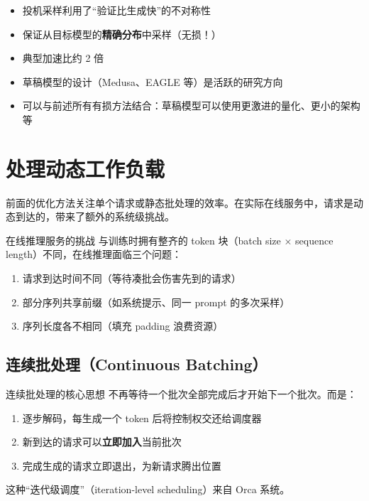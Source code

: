 \documentclass[a4paper]{article}
\begin{document}
\begin{itemize}
    \item 投机采样利用了``验证比生成快''的不对称性
    \item 保证从目标模型的\textbf{精确分布}中采样（无损！）
    \item 典型加速比约 2 倍
    \item 草稿模型的设计（Medusa、EAGLE 等）是活跃的研究方向
    \item 可以与前述所有有损方法结合：草稿模型可以使用更激进的量化、更小的架构等
\end{itemize}


\section{处理动态工作负载}

前面的优化方法关注单个请求或静态批处理的效率。在实际在线服务中，请求是动态到达的，带来了额外的系统级挑战。

\begin{knowledgebox}{在线推理服务的挑战}
与训练时拥有整齐的 token 块（batch size $\times$ sequence length）不同，在线推理面临三个问题：
\begin{enumerate}
    \item 请求到达时间不同（等待凑批会伤害先到的请求）
    \item 部分序列共享前缀（如系统提示、同一 prompt 的多次采样）
    \item 序列长度各不相同（填充 padding 浪费资源）
\end{enumerate}
\end{knowledgebox}

\subsection{连续批处理（Continuous Batching）}

\begin{importantbox}{连续批处理的核心思想}
不再等待一个批次全部完成后才开始下一个批次。而是：
\begin{enumerate}
    \item 逐步解码，每生成一个 token 后将控制权交还给调度器
    \item 新到达的请求可以\textbf{立即加入}当前批次
    \item 完成生成的请求立即退出，为新请求腾出位置
\end{enumerate}
这种``迭代级调度''（iteration-level scheduling）来自 Orca 系统。
\end{importantbox}
\end{document}
